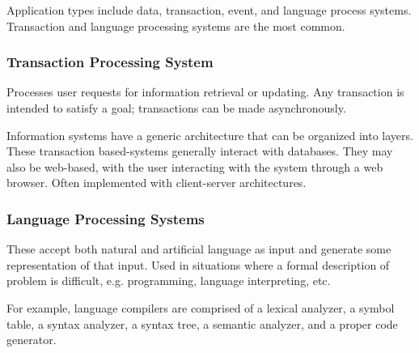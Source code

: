 \documentclass[12pt]{article}
\begin{document}
Application types include data, transaction, event, and language process systems. Transaction and language processing systems are the most common.

\subsubsection*{Transaction Processing System}

Processes user requests for information retrieval or updating. Any transaction is intended to satisfy a goal; transactions can be made asynchronously.

Information systems have a generic architecture that can be organized into layers. These transaction based-systems generally interact with databases. They may also be web-based, with the user interacting with the system through a web browser. Often implemented with client-server architectures.

\subsubsection*{Language Processing Systems}

These accept both natural and artificial language as input and generate some representation of that input. Used in situations where a formal description of problem is difficult, e.g. programming, language interpreting, etc.

For example, language compilers are comprised of a lexical analyzer, a symbol table, a syntax analyzer, a syntax tree, a semantic analyzer, and a proper code generator.
\end{document}
